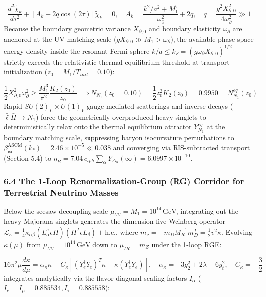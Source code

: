 \documentclass[aps,prd,onecolumn,superscriptaddress,nofootinbib,longbibliography,10pt]{revtex4-2}
\begin{document}
\[\frac{d^2\tilde{\chi}_k}{d\tau^2} + [A_k - 2q \cos(2\tau)]\tilde{\chi}_k = 0, \quad A_k = \frac{k^2/a^2 + M_1^2}{\omega_\partial^2} + 2q, \quad q = \frac{g^2 X_{\partial,0}^2}{4\omega_\partial^2} \gg 1\]
Because the boundary geometric variance \(X_{\partial,0}\) and boundary elasticity \(\omega_\partial\) are anchored at the UV matching scale (\(g X_{\partial,0} \gg M_1 > \omega_\partial\)), the available phase-space energy density inside the resonant Fermi sphere \(k/a \le k_F = (g\omega_\partial X_{\partial,0})^{1/2}\) strictly exceeds the relativistic thermal equilibrium threshold at transport initialization (\(z_0 = M_1 / T_{init} = 0.10\)):


\[\frac{1}{2}X_{\partial,0}^2 \omega_\partial^2 \ge \frac{M_1^3}{\pi^2} \frac{K_2(z_0)}{z_0} \implies N_{N_1}(z_0 = 0.10) = \frac{1}{2}z_0^2 K_2(z_0) = 0.9950 = N_{N_1}^{eq}(z_0)\]
Rapid \(SU(2)_L \times U(1)_Y\) gauge-mediated scatterings and inverse decays (\(\bar{\ell}\bar{H} \to N_1\)) force the geometrically overproduced heavy singlets to deterministically relax onto the thermal equilibrium attractor \(Y_{N_1}^{eq}\) at the boundary matching scale, suppressing baryon isocurvature perturbations to \(\beta_{\mathrm{iso}}^{\mathrm{ASCM}}(k_*) = 2.46 \times 10^{-5} \ll 0.038\) and converging via RIS-subtracted transport (Section 5.4) to \(\eta_B = 7.04\,c_{sph} \sum_\alpha Y_{\Delta_\alpha}(\infty) = 6.0997 \times 10^{-10}\).




\subsubsection*{6.4 The 1-Loop Renormalization-Group (RG) Corridor for Terrestrial Neutrino Masses}

Below the seesaw decoupling scale \(\mu_{UV} = M_1 = 10^{14}\,\mathrm{GeV}\), integrating out the heavy Majorana singlets generates the dimension-five Weinberg operator \(\mathcal{L}_\kappa = \frac{1}{4}\kappa_{\alpha\beta}(\overline{L_\alpha^c} \epsilon H)(H^T \epsilon L_\beta) + \mathrm{h.c.}\), where \(m_\nu = -m_D M_R^{-1} m_D^T = \frac{1}{2}v^2\kappa\). Evolving \(\kappa(\mu)\) from \(\mu_{UV} = 10^{14}\,\mathrm{GeV}\) down to \(\mu_{IR} = m_Z\) under the 1-loop RGE:


\[16\pi^2 \mu \frac{d\kappa}{d\mu} = \alpha_\kappa \kappa + C_\kappa \left[ (Y_e^\dagger Y_e)^T \kappa + \kappa (Y_e^\dagger Y_e) \right], \quad \alpha_\kappa = -3g_2^2 + 2\lambda + 6y_t^2, \quad C_\kappa = -\frac{3}{2}\]
integrates analytically via the flavor-diagonal scaling factors \(I_\alpha\) (\(I_e = I_\mu = 0.885534, I_\tau = 0.885558\)):
\end{document}
